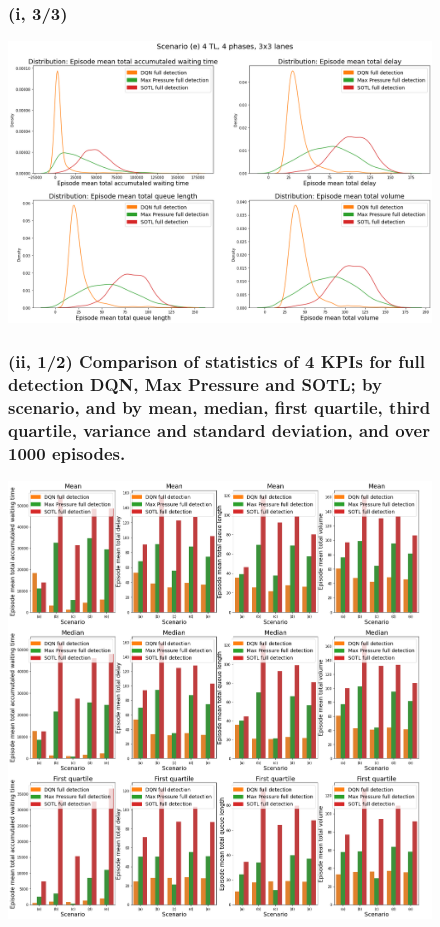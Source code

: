 \begin{figure}[h]
\subsubsection*{(i, 3/3)}
\includegraphics[width=\textwidth]{img/Appendix/1_5.png}
\centering
\end{figure}
\restoregeometry

\pagebreak

\begin{figure}[h]
\subsubsection*{(ii, 1/2) Comparison of statistics of 4 KPIs for full detection DQN, Max Pressure and SOTL; by scenario, and by mean, median, first quartile, third quartile, variance and standard deviation, and over 1000 episodes.}
\includegraphics[width=\textwidth]{img/Appendix/2_1.png}
\centering
\end{figure}
\restoregeometry

